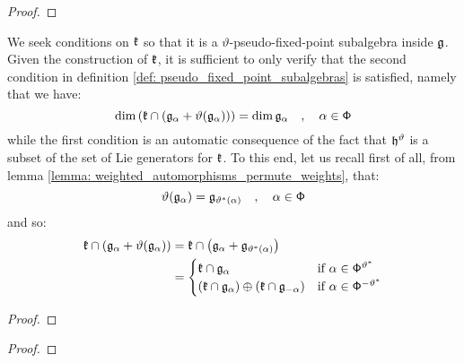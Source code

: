         
        \begin{proposition} \label{prop: adjoint_actions_of_pseudo_fixed_point_subalgebras}
            
        \end{proposition}
            \begin{proof}
                
            \end{proof}

        We seek conditions on $\mathfrak{k}$ so that it is a $\vartheta$-pseudo-fixed-point subalgebra inside $\mathfrak{g}$. Given the construction of $\mathfrak{k}$, it is sufficient to only verify that the second condition in definition \ref{def: pseudo_fixed_point_subalgebras} is satisfied, namely that we have:
            $$\dim\left( \mathfrak{k} \cap \left( \mathfrak{g}_{\alpha} + \vartheta(\mathfrak{g}_{\alpha}) \right) \right) = \dim \mathfrak{g}_{\alpha} \quad, \quad \alpha \in \mathsf{\Phi}$$
        while the first condition is an automatic consequence of the fact that $\mathfrak{h}^{\vartheta}$ is a subset of the set of Lie generators for $\mathfrak{k}$. To this end, let us recall first of all, from lemma \ref{lemma: weighted_automorphisms_permute_weights}, that:
            $$\vartheta(\mathfrak{g}_{\alpha}) = \mathfrak{g}_{\vartheta^*(\alpha)} \quad, \quad \alpha \in \mathsf{\Phi}$$
        and so:
            $$
                \begin{aligned}
                    \mathfrak{k} \cap \left( \mathfrak{g}_{\alpha} + \vartheta(\mathfrak{g}_{\alpha}) \right) & = \mathfrak{k} \cap \left( \mathfrak{g}_{\alpha} + \mathfrak{g}_{\vartheta^*(\alpha)} \right)
                    \\
                    & =
                    \begin{cases}
                        \mathfrak{k} \cap \mathfrak{g}_{\alpha} & \text{if $\alpha \in \mathsf{\Phi}^{\vartheta^*}$}
                        \\
                        (\mathfrak{k} \cap \mathfrak{g}_{\alpha}) \oplus (\mathfrak{k} \cap \mathfrak{g}_{-\alpha}) & \text{if $\alpha \in \mathsf{\Phi}^{-\vartheta^*}$}
                    \end{cases}
                \end{aligned}
            $$
        \begin{proposition} \label{prop: constructing_pseudo_fixed_point_subalgebras}
            
        \end{proposition}
            \begin{proof}
                
            \end{proof}
        \begin{corollary} \label{coro: pseudo_iwasawa_decompositions}
            
        \end{corollary}
            \begin{proof}
                
            \end{proof}

